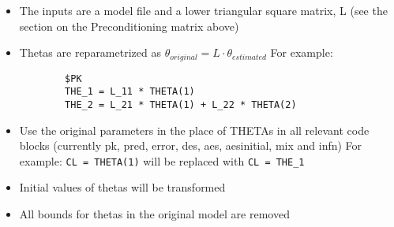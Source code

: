 \begin{itemize}
    \item The inputs are a model file and a lower triangular square matrix, L (see the section on the Preconditioning matrix above)
    \item Thetas are reparametrized as $\theta_{original} = L \cdot \theta_{estimated}$ For example:
        \begin{verbatim}
        $PK
        THE_1 = L_11 * THETA(1)
        THE_2 = L_21 * THETA(1) + L_22 * THETA(2)
        \end{verbatim}
    \item Use the original parameters in the place of THETAs in all relevant code blocks (currently pk, pred, error, des, aes, aesinitial, mix and infn)
        For example: \verb|CL = THETA(1)| will be replaced with \verb|CL = THE_1|
	\item Initial values of thetas will be transformed
	\item All bounds for thetas in the original model are removed
\end{itemize}



